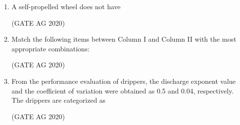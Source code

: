 \documentclass[journal]{IEEEtran}
\begin{document}
\begin{enumerate}
\medskip

\item 
A self-propelled wheel does not have
\begin{enumerate}
\end{enumerate}
\hfill(GATE AG 2020)\\

\medskip

\item 
Match the following items between Column I and Column II with the most appropriate combinations:



\begin{enumerate}
\end{enumerate}
\hfill(GATE AG 2020)\\

\medskip

\item 
From the performance evaluation of drippers, the discharge exponent value and the coefficient of variation were obtained as 0.5 and 0.04, respectively. The drippers are categorized as
\begin{enumerate}
\end{enumerate}
\hfill(GATE AG 2020)\\


\end{enumerate}
\end{document}

